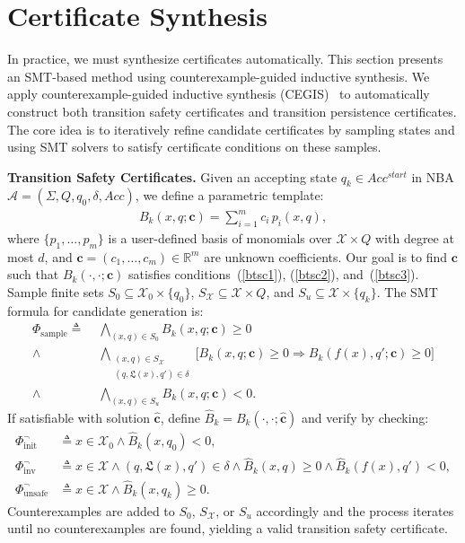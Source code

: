 \section{Certificate Synthesis}
\label{sec:synthesis}
In practice, we must synthesize certificates automatically. This section presents an SMT-based method using counterexample-guided inductive synthesis. We apply counterexample-guided inductive synthesis (CEGIS)~\cite{solar2008program} to automatically construct both transition safety certificates and transition persistence certificates. The core idea is to iteratively refine candidate certificates by sampling states and using SMT solvers to satisfy certificate conditions on these samples.

\textbf{Transition Safety Certificates.} Given an accepting state $q_k \in Acc^{start}$ in NBA $\mathcal{A} = (\Sigma, Q, q_0, \delta, Acc)$, we define a parametric template:
\begin{align}
B_k(x, q; \mathbf{c}) = \sum_{i=1}^{m} c_i \, p_i(x, q),
\end{align}
where $\{p_1, \ldots, p_m\}$ is a user-defined basis of monomials over $\mathcal{X} \times Q$ with degree at most $d$, and $\mathbf{c} = (c_1, \ldots, c_m) \in \mathbb{R}^m$ are unknown coefficients. Our goal is to find $\mathbf{c}$ such that $B_k(\cdot, \cdot; \mathbf{c})$ satisfies conditions~(\ref{btsc1}), (\ref{btsc2}), and~(\ref{btsc3}). Sample finite sets $S_0 \subseteq \mathcal{X}_0 \times \{q_0\}$, $S_{\mathcal{X}} \subseteq \mathcal{X} \times Q$, and $S_u \subseteq \mathcal{X} \times \{q_k\}$. The SMT formula for candidate generation is:
\begin{align}
  \Phi_{\text{sample}} \triangleq \;
  &\bigwedge_{(x,q) \in S_0} B_k(x, q; \mathbf{c}) \geq 0 \label{smt:init} \\
  \wedge \; &\bigwedge_{\substack{(x,q) \in S_{\mathcal{X}} \\ (q, \mathfrak{L}(x), q') \in \delta}} \big[ B_k(x, q; \mathbf{c}) \geq 0 \Rightarrow B_k(f(x), q'; \mathbf{c}) \geq 0 \big] \label{smt:inv} \\
  \wedge \; &\bigwedge_{(x,q) \in S_u} B_k(x, q; \mathbf{c}) < 0. \label{smt:unsafe}
\end{align}
If satisfiable with solution $\hat{\mathbf{c}}$, define $\hat{B}_k = B_k(\cdot, \cdot; \hat{\mathbf{c}})$ and verify by checking:
\begin{align}
  \Phi_{\text{init}}^{\neg} &\triangleq x \in \mathcal{X}_0 \land \hat{B}_k(x, q_0) < 0, \label{smt:cex-init} \\
  \Phi_{\text{inv}}^{\neg} &\triangleq x \in \mathcal{X} \land (q, \mathfrak{L}(x), q') \in \delta \land \hat{B}_k(x, q) \geq 0 \land \hat{B}_k(f(x), q') < 0, \label{smt:cex-inv} \\
  \Phi_{\text{unsafe}}^{\neg} &\triangleq x \in \mathcal{X} \land \hat{B}_k(x, q_k) \geq 0. \label{smt:cex-unsafe}
\end{align}
Counterexamples are added to $S_0$, $S_{\mathcal{X}}$, or $S_u$ accordingly and the process iterates until no counterexamples are found, yielding a valid transition safety certificate.

